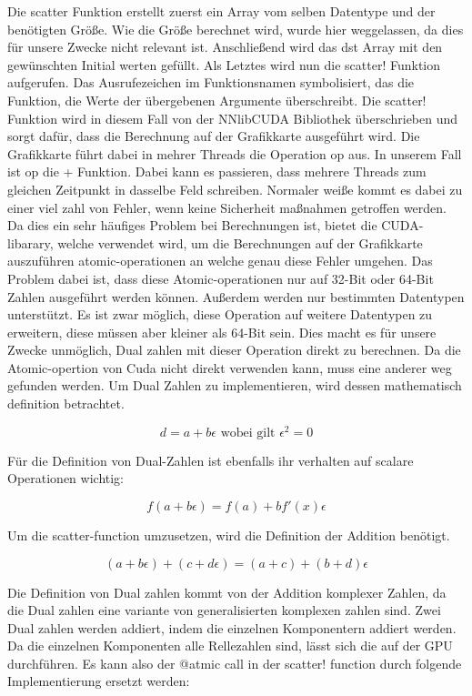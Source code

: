 Die scatter Funktion erstellt zuerst ein Array vom selben Datentype und der benötigten Größe. 
Wie die Größe berechnet wird, wurde hier weggelassen, da dies für unsere Zwecke nicht relevant ist. 
Anschließend wird das dst Array mit den gewünschten Initial werten gefüllt.
Als Letztes wird nun die scatter! Funktion aufgerufen.
Das Ausrufezeichen im Funktionsnamen symbolisiert, das die Funktion, die Werte der übergebenen Argumente überschreibt.
Die scatter! Funktion wird in diesem Fall von der NNlibCUDA Bibliothek überschrieben und sorgt dafür, 
dass die Berechnung auf der Grafikkarte ausgeführt wird.
Die Grafikkarte führt dabei in mehrer Threads die Operation op aus. In unserem Fall ist op die + Funktion.
Dabei kann es passieren, dass mehrere Threads zum gleichen Zeitpunkt in dasselbe Feld schreiben.
Normaler weiße kommt es dabei zu einer viel zahl von Fehler, wenn keine Sicherheit maßnahmen getroffen werden. 
Da dies ein sehr häufiges Problem bei Berechnungen ist, bietet die CUDA-libarary, 
welche verwendet wird, um die Berechnungen auf der Grafikkarte auszuführen atomic-operationen an
welche genau diese Fehler umgehen.
Das Problem dabei ist, dass diese Atomic-operationen nur auf 32-Bit oder 64-Bit Zahlen ausgeführt werden können.
Außerdem werden nur bestimmten Datentypen unterstützt.
Es ist zwar möglich, diese Operation auf weitere Datentypen zu erweitern, diese müssen aber kleiner als 64-Bit sein. 
Dies macht es für unsere Zwecke unmöglich, Dual zahlen mit dieser Operation direkt zu berechnen.
Da die Atomic-opertion von Cuda nicht direkt verwenden kann, muss eine anderer weg gefunden werden.
Um Dual Zahlen zu implementieren, wird dessen mathematisch definition betrachtet.

$$
d = a + b \epsilon \text{ wobei gilt } \epsilon^2 = 0
$$

Für die Definition von Dual-Zahlen ist ebenfalls ihr verhalten auf scalare Operationen wichtig:

$$
 f( a + b \epsilon ) = f(a) + b f'(x) \epsilon
$$

Um die scatter-function umzusetzen, wird die Definition der Addition benötigt.

$$
(a + b \epsilon) + ( c + d \epsilon ) = (a + c) + (b + d) \epsilon
$$

Die Definition von Dual zahlen kommt von der Addition komplexer Zahlen, 
da die Dual zahlen eine variante von generalisierten komplexen zahlen sind.
Zwei Dual zahlen werden addiert, indem die einzelnen Komponentern addiert werden.
Da die einzelnen Komponenten  alle Rellezahlen sind, lässt sich die auf der GPU durchführen.
Es kann also der @atmic call in der scatter! function durch folgende Implementierung ersetzt werden:

